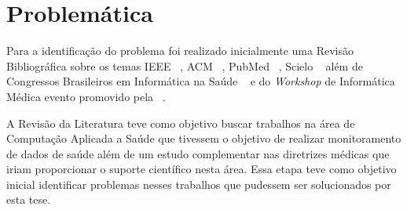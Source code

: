 





\section{Problemática}\label{section:problematica}
Para a identificação do problema foi realizado inicialmente uma Revisão Bibliográfica sobre os temas IEEE ~\cite{ieee}, ACM ~\cite{acm}, PubMed ~\cite{pubmed}, Scielo ~\cite{scielo} além de Congressos Brasileiros em Informática na Saúde ~\cite{cbis} e do \textit{Workshop} de Informática Médica evento promovido pela ~\cite{sbc}.

A Revisão da Literatura teve como objetivo buscar trabalhos na área de Computação Aplicada a Saúde que tivessem o objetivo de realizar monitoramento de dados de saúde além de um estudo complementar nas diretrizes médicas que iriam proporcionar o suporte científico nesta área. Essa etapa teve como objetivo inicial identificar problemas nesses trabalhos que pudessem ser solucionados por esta tese.

